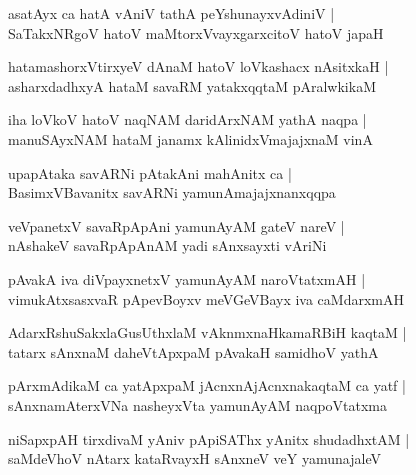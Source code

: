 \documentclass[twoside,12pt,openright]{book}
\newcounter{shloka}[chapter]
\begin{document}
\begin{shloka}
asatAyx ca hatA vAniV tathA peYshunayxvAdiniV |\\
SaTakxNRgoV hatoV maMtorxVvayxgarxcitoV hatoV japaH 
\end{shloka}

\begin{shloka}
hatamashorxVtirxyeV dAnaM hatoV loVkashacx nAsitxkaH |\\
asharxdadhxyA hataM savaRM yatakxqqtaM pAralwkikaM 
\end{shloka}

\begin{shloka}
iha loVkoV hatoV naqNAM daridArxNAM yathA naqpa |\\
manuSAyxNAM hataM janamx kAlinidxVmajajxnaM vinA 
\end{shloka}

\begin{shloka}
upapAtaka savARNi pAtakAni mahAnitx ca |\\
BasimxVBavanitx savARNi yamunAmajajxnanxqqpa
\end{shloka}

\begin{shloka}
veVpanetxV savaRpApAni yamunAyAM gateV nareV |\\
nAshakeV savaRpApAnAM yadi sAnxsayxti vAriNi
\end{shloka}

\begin{shloka}
pAvakA iva diVpayxnetxV yamunAyAM naroVtatxmAH |\\
vimukAtxsasxvaR pApevBoyxv meVGeVBayx iva caMdarxmAH 
\end{shloka}

\begin{shloka}
AdarxRshuSakxlaGusUthxlaM vAknmxnaHkamaRBiH kaqtaM |\\
tatarx sAnxnaM daheVtApxpaM pAvakaH samidhoV yathA 
\end{shloka}

\begin{shloka}
pArxmAdikaM ca yatApxpaM jAcnxnAjAcnxnakaqtaM ca yatf |\\
sAnxnamAterxVNa nasheyxVta yamunAyAM naqpoVtatxma 
\end{shloka}

\begin{shloka}
niSapxpAH tirxdivaM yAniv pApiSAThx yAnitx shudadhxtAM |\\
saMdeVhoV nAtarx kataRvayxH sAnxneV veY yamunajaleV 
\end{shloka}
\end{document}
